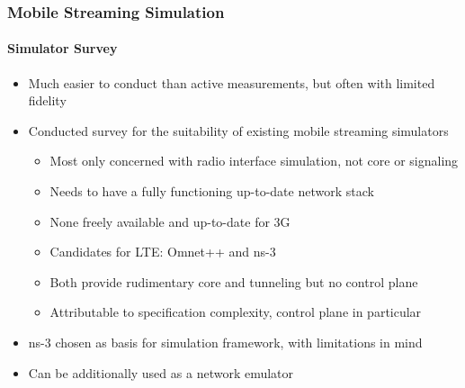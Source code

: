 \documentclass{beamer}
\begin{document}
\begin{frame}
	\frametitle{Mobile Streaming Simulation}
	\framesubtitle{Simulator Survey}

	\begin{itemize}
		\item Much easier to conduct than active measurements, but often with limited fidelity
		\item Conducted survey for the suitability of existing mobile streaming simulators
		\begin{itemize}
			\item Most only concerned with radio interface simulation, not core or signaling
			\item Needs to have a fully functioning up-to-date network stack
			\item None freely available and up-to-date for 3G
			\item Candidates for LTE: Omnet++ and ns-3
			\item Both provide rudimentary core and tunneling but no control plane
			\item Attributable to specification complexity, control plane in particular
		\end{itemize}

		\item ns-3 chosen as basis for simulation framework, with limitations in mind
		\item Can be additionally used as a network emulator
	\end{itemize}
\end{frame}
\end{document}
